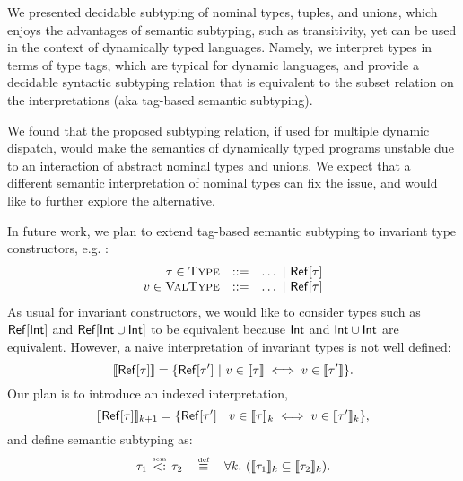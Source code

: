 We presented decidable subtyping of nominal types, tuples, and unions, 
which enjoys the advantages of semantic subtyping, such as transitivity,
yet can be used in the context of dynamically typed languages.
Namely, we interpret types in terms of type tags, 
which are typical for dynamic languages,
and provide a decidable syntactic subtyping relation that is
equivalent to the subset relation on the interpretations
(aka tag-based semantic subtyping).

We found that the proposed subtyping relation, 
if used for multiple dynamic dispatch, 
would make the semantics of dynamically typed programs unstable
due to an interaction of abstract nominal types and unions.
We expect that a different semantic interpretation of nominal types 
can fix the issue, and would like to further explore the alternative.

In future work, we plan to extend tag-based semantic subtyping 
to invariant type constructors, e.g. :
\[
\begin{array}{rcl}
\tau \in \textsc{Type}   &::=& \ldots ~\vert~ \mathsf{Ref}[\tau]\\
v \in \textsc{ValType} &::=& \ldots ~\vert~ \mathsf{Ref}[\tau]
\end{array}
\]
As usual for invariant constructors, 
we would like to consider types such as $\mathsf{Ref}[\mathsf{Int}]$
and $\mathsf{Ref}[\mathsf{Int} \cup \mathsf{Int}]$ to be equivalent
because $\mathsf{Int}$ and $\mathsf{Int} \cup \mathsf{Int}$ are equivalent.
However, a naive interpretation of invariant types is not well defined:
\[
\llbracket \mathsf{Ref}[\tau] \rrbracket = 
\{ \mathsf{Ref}[\tau'] ~\vert~ v \in \llbracket \tau \rrbracket \iff v \in \llbracket \tau' \rrbracket \}.
\]
Our plan is to introduce an indexed interpretation,
\[
\llbracket \mathsf{Ref}[\tau] \rrbracket_{k+1} = \{ \mathsf{Ref}[\tau'] 
    ~\vert~ v \in \llbracket \tau \rrbracket_k \iff v \in \llbracket \tau' \rrbracket_k \},
\]
and define semantic subtyping as:
\[
\bjtruesemsub{\ty_1}{\ty_2} \quad \defsign \quad
\forall k.\ (\interpty{\ty_1}_k \subseteq \interpty{\ty_2}_k).
\]

